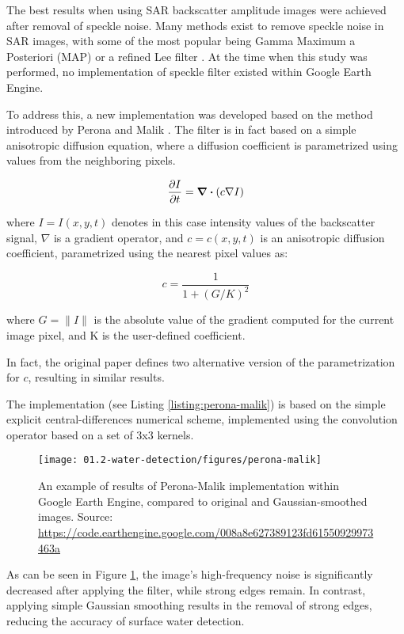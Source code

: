 The best results when using SAR backscatter amplitude images were achieved after removal of speckle noise. Many methods exist to remove speckle noise in SAR images, with some of the most popular being Gamma Maximum a Posteriori (MAP) \citet{lopes1990maximum} or a refined Lee filter \citet{lee1981speckle}. At the time when this study was performed, no implementation of speckle filter existed within Google Earth Engine. 

To address this, a new implementation was developed based on the method introduced by Perona and Malik \citet{perona1990scale}. The filter is in fact based on a simple anisotropic diffusion equation, where a diffusion coefficient is parametrized using values from the neighboring pixels. 

\begin{equation}
\pdv{I}{t} = \div{ \left( c \nabla I\right) }
\end{equation}

where $I=I(x,y,t)$ denotes in this case intensity values of the backscatter signal, $\nabla$ is a gradient operator, and $c=c(x,y,t)$ is an anisotropic diffusion coefficient, parametrized using the nearest pixel values as:

\begin{equation}
c = \frac{1}{1 + \left(G/K\right)^2}
\end{equation}

where $G = \|  I\|$ is the absolute value of the gradient computed for the current image pixel, and K is the user-defined coefficient.

In fact, the original paper defines two alternative version of the parametrization for $c$, resulting in similar results.


The implementation (see Listing \ref{listing:perona-malik}) is based on the simple explicit central-differences numerical scheme, implemented using the convolution operator based on a set of 3x3 kernels. 

\begin{figure}[H]
	\texttt{[image: 01.2-water-detection/figures/perona-malik]}
	\caption{An example of results of Perona-Malik implementation within Google Earth Engine, compared to original and Gaussian-smoothed images. Source: \url{https://code.earthengine.google.com/008a8e627389123fd61550929973463a}}
	\label{fig:perona-malik}
\end{figure}

As can be seen in Figure \ref{fig:perona-malik}, the image's high-frequency noise is significantly decreased after applying the filter, while strong edges remain. In contrast, applying simple Gaussian smoothing results in the removal of strong edges, reducing the accuracy of surface water detection.

